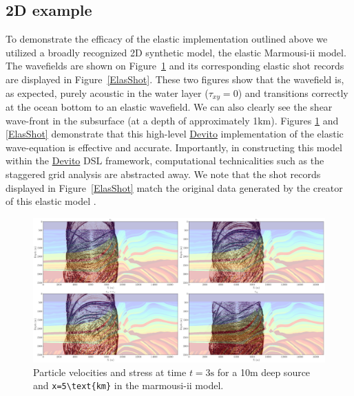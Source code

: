 \documentclass[10pt, conference]{IEEEtran}
\newcommand{\devito}{\href{https://github.com/devitocodes/devito}{Devito} }
\begin{document}
\subsection{2D example}\label{d-example}

To demonstrate the efficacy of the elastic implementation outlined
above we utilized a broadly recognized 2D synthetic model, the elastic
Marmousi-ii\cite{versteeg927, marmouelas} model. The wavefields are
shown on Figure~\ref{ElasWf} and its corresponding elastic shot records
are displayed in Figure~\ref{ElasShot}. These two figures show that the
wavefield is, as expected, purely acoustic in the water layer
($\tau_{xy}=0$) and transitions correctly at the ocean bottom to
an elastic wavefield. We can also clearly see the shear wave-front
in the subsurface (at a depth of approximately 1km). Figures \ref{ElasWf}
and \ref{ElasShot} demonstrate that this high-level \devito implementation
of the elastic wave-equation is effective and accurate.  Importantly, in
constructing this model within the \devito DSL framework, computational
technicalities such as the staggered grid analysis are abstracted away. We
note that the shot records displayed in Figure~\ref{ElasShot} match the
original data generated by the creator of this elastic model \cite{marmouelas}.

\begin{figure}
\centering
\includegraphics[width=1.000\hsize]{./Figures/marmou_snap.png}
\caption{Particle velocities and stress at time $t=3\text{s}$ for a
10m deep source and \texttt{x=5\textbackslash{}text\{km\}} in the
marmousi-ii model.}\label{ElasWf}
\end{figure}
\end{document}
